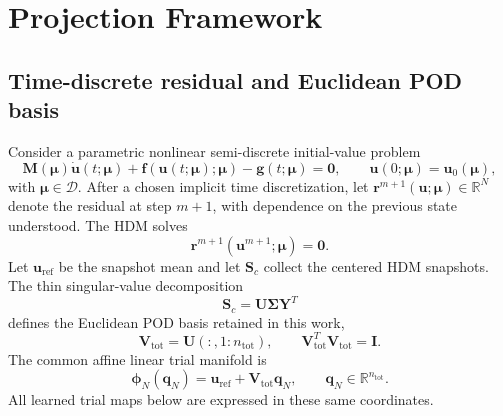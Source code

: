 \documentclass[11pt]{article}
\newcommand{\q}{\mathbf q}
\newcommand{\uvec}{\mathbf u}
\newcommand{\mub}{\bm\mu}
\begin{document}
\section{Projection Framework}
\label{sec:projection-framework}
\subsection{Time-discrete residual and Euclidean POD basis}
Consider a parametric nonlinear semi-discrete initial-value problem
\begin{equation}
\mathbf M(\mub)\dot{\uvec}(t;\mub)+\mathbf f(\uvec(t;\mub);\mub)
-\mathbf g(t;\mub)=\mathbf0,\qquad \uvec(0;\mub)=\uvec_0(\mub),
\label{eq:ivp}
\end{equation}
with $\mub\in\mathcal D$.  After a chosen implicit time discretization, let
$\mathbf r^{m+1}(\uvec;\mub)\in\mathbb R^N$ denote the residual at step
$m+1$, with dependence on the previous state understood.  The HDM solves
\begin{equation}
\mathbf r^{m+1}(\uvec^{m+1};\mub)=\mathbf0.
\label{eq:discrete-residual}
\end{equation}
Let $\uvec_{\mathrm{ref}}$ be the snapshot mean and let $\mathbf S_c$ collect
the centered HDM snapshots.  The thin singular-value decomposition
\begin{equation}
\mathbf S_c=\mathbf U\boldsymbol\Sigma\mathbf Y^T
\end{equation}
defines the Euclidean POD basis retained in this work,
\begin{equation}
\mathbf V_{\mathrm{tot}}=\mathbf U(:,1:n_{\mathrm{tot}}),\qquad
\mathbf V_{\mathrm{tot}}^T\mathbf V_{\mathrm{tot}}=\mathbf I.
\label{eq:euclidean-pod}
\end{equation}
The common affine linear trial manifold is
\begin{equation}
\boldsymbol\phi_N(\q_N)=\uvec_{\mathrm{ref}}+
\mathbf V_{\mathrm{tot}}\q_N,\qquad
\q_N\in\mathbb R^{n_{\mathrm{tot}}}.
\label{eq:linear-reconstruction}
\end{equation}
All learned trial maps below are expressed in these same coordinates.
\end{document}
